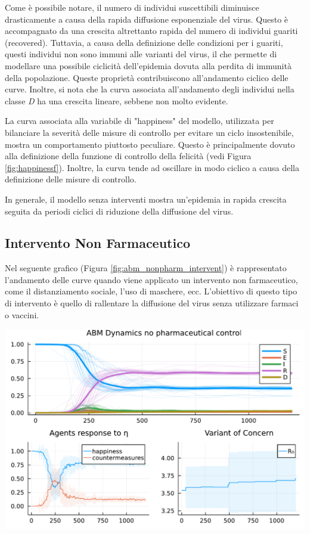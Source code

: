 Come è possibile notare, il numero di individui suscettibili 
diminuisce drasticamente a causa della rapida diffusione 
esponenziale del virus. Questo è accompagnato da una crescita 
altrettanto rapida del numero di individui guariti (recovered). 
Tuttavia, a causa della definizione delle condizioni per i guariti, 
questi individui non sono immuni alle varianti del virus, il che 
permette di modellare una possibile ciclicità dell'epidemia 
dovuta alla perdita di immunità della popolazione. 
Queste proprietà contribuiscono all'andamento ciclico delle curve. 
Inoltre, si nota che la curva associata all'andamento degli 
individui nella classe \emph{D} ha una crescita lineare, 
sebbene non molto evidente.

La curva associata alla variabile di "happiness" del modello, 
utilizzata per bilanciare la severità delle misure di controllo 
per evitare un ciclo insostenibile, mostra un comportamento 
piuttosto peculiare. Questo è principalmente dovuto alla 
definizione della funzione di controllo della felicità 
(vedi Figura \ref{fig:happinessf}). Inoltre, la curva tende 
ad oscillare in modo ciclico a causa della definizione delle 
misure di controllo.

In generale, il modello senza interventi mostra un'epidemia in 
rapida crescita seguita da periodi ciclici di riduzione della 
diffusione del virus.

\subsection{Intervento Non Farmaceutico}

Nel seguente grafico (Figura \ref{fig:abm_nonpharm_intervent}) è 
rappresentato l'andamento delle curve quando viene applicato un 
intervento non farmaceutico, come il distanziamento sociale, 
l'uso di maschere, ecc. L'obiettivo di questo tipo di intervento 
è quello di rallentare la diffusione del virus senza utilizzare 
farmaci o vaccini.

\begin{minipage}{\linewidth}
    \centering
    \includegraphics[width=\textwidth]{img/SocialNetworkABM_CONTROL.pdf}
    \label{fig:abm_nonpharm_intervent}
\end{minipage}

